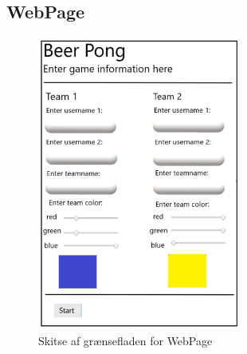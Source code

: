 \documentclass[Kravspecifikation/Kravspec_Main.tex]{subfiles}
\begin{document}
\subsection{WebPage}
\begin{figure}[H]
    \centering
    \includegraphics[width=0.6\textwidth]{Kravspecifikation/Ikke-funktionelle/graphics/WebPage_IF.png}
    \caption{Skitse af grænsefladen for WebPage}
   \label{fig:WebPage_IF}
\end{figure}
\end{document}

